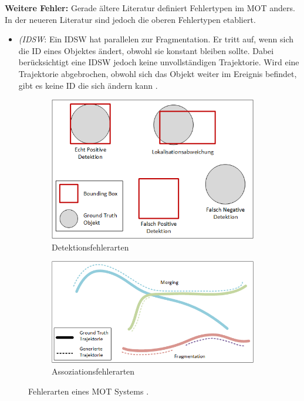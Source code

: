 \textbf{Weitere Fehler:}
Gerade ältere Literatur definiert Fehlertypen im \gls{MOT} anders. In der neueren Literatur sind jedoch die oberen Fehlertypen etabliert.

\begin{itemize}
    \item \textit{(\gls{IDSW}}: Ein \gls{IDSW} hat parallelen zur Fragmentation. Er tritt auf, wenn sich die \gls{ID} eines Objektes ändert, obwohl sie konstant bleiben sollte. Dabei berücksichtigt eine \gls{IDSW} jedoch keine unvollständigen \gls{Trajektorie}. Wird eine \gls{Trajektorie} abgebrochen, obwohl sich das Objekt weiter im \gls{Ereignis} befindet, gibt es keine \acrshort{ID} die sich ändern kann \cite{CLEAR.2008, HOTA, IDF1}.
\end{itemize}

\begin{figure}[p]
 \centering
 \begin{subfigure}[htb]{0.7\textwidth}
     \centering
     \includegraphics[width=\textwidth]{img/Grafiken/MOT Fehlerarten Detektionen.png}
     \caption{Detektionsfehlerarten}
 \end{subfigure}
 \hfill
 \begin{subfigure}[htb]{0.7\textwidth}
     \centering
     \includegraphics[width=\textwidth]{img/Grafiken/MOT Fehlerarten Assoziation.png}
     \caption{Assoziationsfehlerarten}
 \end{subfigure}
    \caption{Fehlerarten eines \gls{MOT} Systems \cite{Leichter.2013}.}
    \label{fig:ErrorTypesMOT}
\end{figure}

